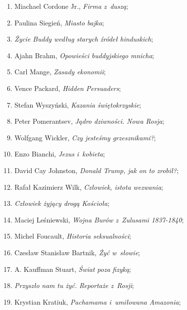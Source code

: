 \documentclass[a4paper,11pt]{article}
\begin{document}
\begin{enumerate}
\item Miachael Cordone Jr., \textit{Firma z~duszą};

\item Paulina Siegień, \textit{Miasto bajka};

\item \textit{Życie Buddy według starych źródeł hinduskich};

\item Ajahn Brahm, \textit{Opowieści buddyjskiego mnicha};

\item Carl Mange, \textit{Zasady ekonomii};

\item Vence Packard, \textit{Hidden Persuaders};

\item Stefan Wyszyński, \textit{Kazania świętokrzyskie};

\item Peter Pomerantsev, \textit{Jądro dziwności. Nowa Rosja};

\item Wolfgang Wickler, \textit{Czy jesteśmy grzesznikami?};

\item Enzo Bianchi, \textit{Jezus i~kobieta};

\item David Cay Johnston, \textit{Donald Trump, jak on to zrobił?};

\item Rafał Kazimierz Wilk, \textit{Człowiek, istota wezwania};

\item \textit{Człowiek żyjący drogą Kościoła};

\item Maciej Leśniewski, \textit{Wojna Burów z~Zulusami 1837-1840};

\item Michel Foucault, \textit{Historia seksualności};

\item Czesław Stanisław Bartnik, \textit{Żyć w~słowie};

\item A. Kauffman Stuart, \textit{Świat poza fizyką};

\item \textit{Przyszło nam tu żyć. Reportaże z~Rosji};

\item Krystian Kratiuk, \textit{Pachamama i~umiłowana Amazonia};


\end{enumerate}
\end{document}
